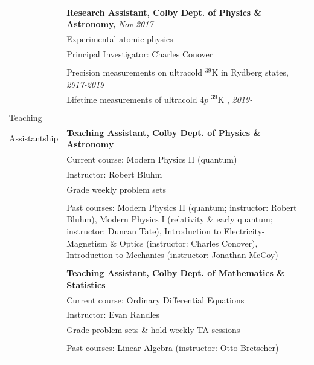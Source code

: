 \documentclass[10pt]{article}
\begin{document}
\begin{longtable}{ l m{13.5cm}   }
     					& \textbf{Research Assistant, Colby Dept. of Physics \& Astronomy,} \textit{Nov 2017- }\\
     					& Experimental atomic physics \\
     					& Principal Investigator: Charles Conover \\ \vspace{-9pt}
     					& \\
     					& Precision measurements on ultracold $^{\text{39}}$K in Rydberg states, \textit{2017-2019} \\
     					& Lifetime measurements of ultracold $4p$ $^{\text{39}}$K , \textit{2019-}\\
     					& \\
     					
     					

     					   					 
     					 
     					 
  \large{Teaching}   	& \\ 
  \large{Assistantship} & \textbf{Teaching Assistant, Colby Dept. of Physics \& Astronomy} \\
  						& Current course: Modern Physics II (quantum)\\
    					& Instructor: Robert Bluhm \\
    					& Grade weekly problem sets \\ \vspace{-9pt}
     					& \\ 
     					& Past courses: Modern Physics II (quantum; instructor: Robert Bluhm), Modern Physics I (relativity \& early quantum; instructor: Duncan Tate), Introduction to Electricity-Magnetism \& Optics (instructor: Charles Conover), Introduction to Mechanics (instructor: Jonathan McCoy)\\
     					& \\
     					 
     					& \textbf{Teaching Assistant, Colby Dept. of Mathematics \& Statistics} \\
     					& Current course: Ordinary Differential Equations\\
     					& Instructor: Evan Randles \\
     					& Grade problem sets \& hold weekly TA sessions \\ \vspace{-9pt}
     					& \\ 
     					& Past courses: Linear Algebra (instructor: Otto Bretscher)\\
     					& \\
     					 

\end{longtable}
\end{document}
